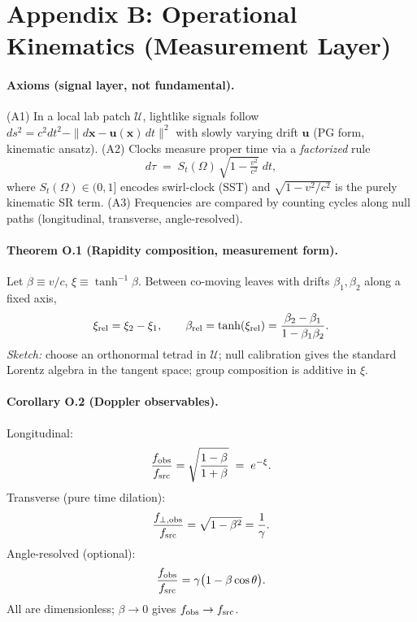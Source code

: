 \documentclass[11pt]{article}
\begin{document}

\section*{Appendix B: Operational Kinematics (Measurement Layer)}

		\paragraph{Axioms (signal layer, not fundamental).}
		(A1) In a local lab patch $\mathcal U$, lightlike signals follow $ds^2 = c^2 dt^2 - \|d\mathbf x - \mathbf u(\mathbf x)\,dt\|^2$
		with slowly varying drift $\mathbf u$ (PG form, kinematic ansatz).
		(A2) Clocks measure proper time via a \emph{factorized} rule
		\[
			d\tau \;=\; S_t(\Omega)\,\sqrt{1-\tfrac{v^2}{c^2}}\;dt,
		\]
		where $S_t(\Omega)\in(0,1]$ encodes swirl-clock (SST) and $\sqrt{1-v^2/c^2}$ is the purely kinematic SR term.
		(A3) Frequencies are compared by counting cycles along null paths (longitudinal, transverse, angle-resolved).

		\paragraph{Theorem O.1 (Rapidity composition, measurement form).}
		Let $\beta \equiv v/c$, $\xi \equiv \tanh^{-1}\!\beta$. Between co-moving leaves with drifts $\beta_1,\beta_2$ along a fixed axis,
		\[
			\xi_{\rm rel}=\xi_2-\xi_1,
			\qquad
			\beta_{\rm rel}=\tanh(\xi_{\rm rel})=\frac{\beta_2-\beta_1}{1-\beta_1\beta_2}.
		\]
		\emph{Sketch:} choose an orthonormal tetrad in $\mathcal U$; null calibration gives the standard Lorentz algebra in the tangent space; group composition is additive in $\xi$.

		\paragraph{Corollary O.2 (Doppler observables).}
		Longitudinal:
		\[
			\frac{f_{\rm obs}}{f_{\rm src}}=\sqrt{\frac{1-\beta}{1+\beta}} \;=\; e^{-\xi}.
		\]
		Transverse (pure time dilation):
		\[
			\frac{f_{\perp,{\rm obs}}}{f_{\rm src}}=\sqrt{1-\beta^2}=\frac{1}{\gamma}.
		\]
		Angle-resolved (optional):
		\[
			\frac{f_{\rm obs}}{f_{\rm src}}=\gamma\bigl(1-\beta\cos\theta\bigr).
		\]
		All are dimensionless; $\beta\to 0$ gives $f_{\rm obs}\to f_{\rm src}$.
\end{document}
